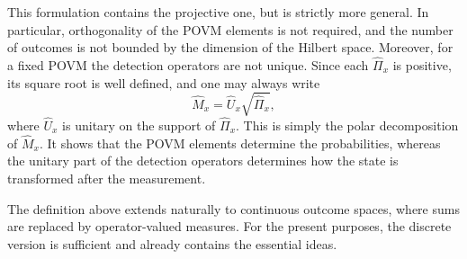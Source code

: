 This formulation contains the projective one, but is strictly more general. In particular, orthogonality of the POVM elements is not required, and the number of outcomes is not bounded by the dimension of the Hilbert space. Moreover, for a fixed POVM the detection operators are not unique. Since each \(\hat \Pi_x\) is positive, its square root is well defined, and one may always write
\begin{equation}
	\hat M_x=\hat U_x \sqrt{\hat \Pi_x},
	\label{eq:open_qs_polar_decomposition_detection_operator}
\end{equation}
where \(\hat U_x\) is unitary on the support of \(\hat \Pi_x\). This is simply the polar decomposition of \(\hat M_x\). It shows that the POVM elements determine the probabilities, whereas the unitary part of the detection operators determines how the state is transformed after the measurement.

The definition above extends naturally to continuous outcome spaces, where sums are replaced by operator-valued measures. For the present purposes, the discrete version is sufficient and already contains the essential ideas.

